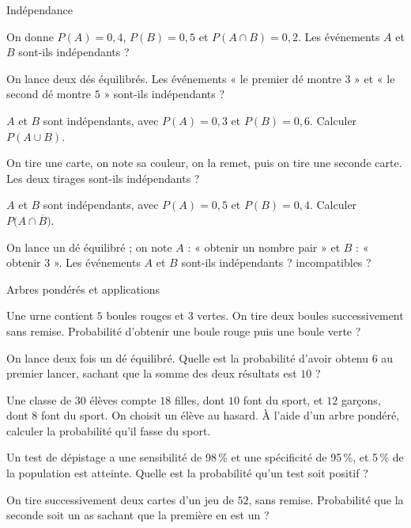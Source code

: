 
\begin{exercice}[2]{Indépendance}
\begin{questions}
  \item On donne $P(A)=0{,}4$, $P(B)=0{,}5$ et $P(A\cap B)=0{,}2$. Les événements $A$ et $B$ sont-ils indépendants ?
  \item On lance deux dés équilibrés. Les événements « le premier dé montre $3$ » et « le second dé montre $5$ » sont-ils indépendants ?
  \item $A$ et $B$ sont indépendants, avec $P(A)=0{,}3$ et $P(B)=0{,}6$. Calculer $P(A\cup B)$.
  \item On tire une carte, on note sa couleur, on la remet, puis on tire une seconde carte. Les deux tirages sont-ils indépendants ?
  \item $A$ et $B$ sont indépendants, avec $P(A)=0{,}5$ et $P(B)=0{,}4$. Calculer $P\big(A\cap\overline B\big)$.
  \item On lance un dé équilibré ; on note $A$ : « obtenir un nombre pair » et $B$ : « obtenir $3$ ». Les événements $A$ et $B$
    sont-ils indépendants ? incompatibles ?
\end{questions}
\end{exercice}

\begin{exercice}[2]{Arbres pondérés et applications}
\begin{questions}
  \item Une urne contient $5$ boules rouges et $3$ vertes. On tire deux boules successivement sans remise. Probabilité d'obtenir
    une boule rouge puis une boule verte ?
  \item On lance deux fois un dé équilibré. Quelle est la probabilité d'avoir obtenu $6$ au premier lancer, sachant que la somme
    des deux résultats est $10$ ?
  \item Une classe de $30$ élèves compte $18$ filles, dont $10$ font du sport, et $12$ garçons, dont $8$ font du sport. On choisit
    un élève au hasard. À l'aide d'un arbre pondéré, calculer la probabilité qu'il fasse du sport.
  \item Un test de dépistage a une sensibilité de 98\,\% et une spécificité de 95\,\%, et 5\,\% de la population est atteinte.
    Quelle est la probabilité qu'un test soit positif ?
  \item On tire successivement deux cartes d'un jeu de $52$, sans remise. Probabilité que la seconde soit un as sachant que la
    première en est un ?
\end{questions}
\end{exercice}

